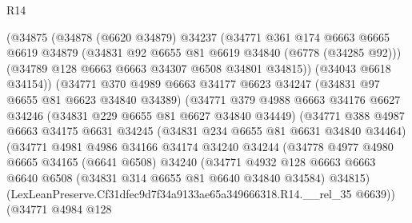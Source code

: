 \begin{lexlean}{R14}
\begin{coremodule}
                    (@34875
                      (@34878
                        (@6620 @34879)
                        @34237
                        (@34771
                          @361
                          @174
                          @6663
                          @6665
                          @6619
                          @34879
                          (@34831 @92 @6655 @81 @6619 @34840 (@6778 (@34285 @92)))
                          (@34789 @128 @6663 @6663 @34307 @6508 @34801 @34815))
                        (@34043 @6618 @34154))
                      (@34771
                        @370
                        @4989
                        @6663
                        @34177
                        @6623
                        @34247
                        (@34831 @97 @6655 @81 @6623 @34840 @34389)
                        (@34771
                          @379
                          @4988
                          @6663
                          @34176
                          @6627
                          @34246
                          (@34831 @229 @6655 @81 @6627 @34840 @34449)
                          (@34771
                            @388
                            @4987
                            @6663
                            @34175
                            @6631
                            @34245
                            (@34831 @234 @6655 @81 @6631 @34840 @34464)
                            (@34771
                              @4981
                              @4986
                              @34166
                              @34174
                              @34240
                              @34244
                              (@34778
                                @4977
                                @4980
                                @6665
                                @34165
                                (@6641 @6508)
                                @34240
                                (@34771
                                  @4932
                                  @128
                                  @6663
                                  @6663
                                  @6640
                                  @6508
                                  (@34831 @314 @6655 @81 @6640 @34840 @34584)
                                  @34815)
                                (LexLeanPreserve.Cf31dfec9d7f34a9133ae65a349666318.R14.__rel_35
                                  @6639))
                              (@34771
                                @4984
                                @128

\end{coremodule}
\end{lexlean}
